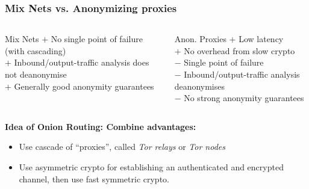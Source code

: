 \begin{frame}
  \frametitle{Mix Nets vs. Anonymizing proxies}
  \begin{columns}[t]
    \begin{block}{Mix Nets}
      {\gr $\mathbf{+}$} No single point of failure (with cascading)\\
      {\gr $\mathbf{+}$} Inbound/output-traffic analysis does not deanonymise\\
      {\gr $\mathbf{+}$} Generally good anonymity guarantees\\
    \end{block}
    {
    \begin{block}{Anon. Proxies}
      {\gr $\mathbf{+}$} Low latency\\
      {\gr $\mathbf{+}$} No overhead from slow crypto\\
        {
      {\rd $\mathbf{-}$} Single point of failure\\
      {\rd $\mathbf{-}$} Inbound/output-traffic analysis deanonymises\\
      {\rd $\mathbf{-}$} No strong anonymity guarantees
        }
    \end{block}
    }
  \end{columns}
  \vspace*{4mm}
  {
    \noindent \textbf{Idea of Onion Routing: Combine advantages:}
  \begin{itemize}
    \item Use cascade of ``proxies'', called \emph{Tor relays} or \emph{Tor nodes}
    \item Use asymmetric crypto for establishing an authenticated and encrypted
      channel, then use fast symmetric crypto.
  \end{itemize}
  }
\end{frame}


